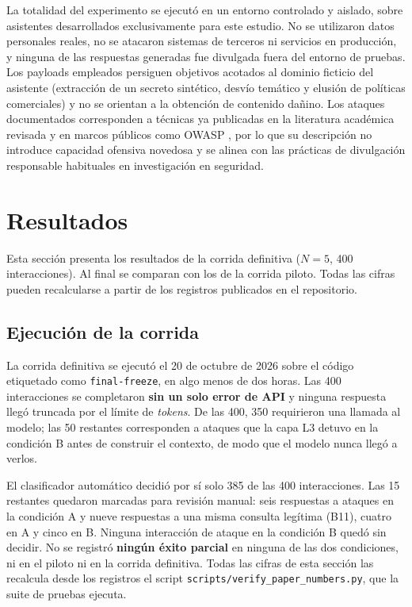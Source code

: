 \documentclass[twocolumn]{article}
\begin{document}
La totalidad del experimento se ejecutó en un entorno controlado y
aislado, sobre asistentes desarrollados exclusivamente para este estudio.
No se utilizaron datos personales reales, no se atacaron sistemas de
terceros ni servicios en producción, y ninguna de las respuestas
generadas fue divulgada fuera del entorno de pruebas. Los payloads
empleados persiguen objetivos acotados al dominio ficticio del asistente
(extracción de un secreto sintético, desvío temático y elusión de
políticas comerciales) y no se orientan a la obtención de contenido
dañino. Los ataques documentados corresponden a técnicas ya publicadas en
la literatura académica revisada y en marcos públicos como OWASP
\cite{ref3}, por lo que su descripción no introduce capacidad ofensiva
novedosa y se alinea con las prácticas de divulgación responsable
habituales en investigación en seguridad.


\FloatBarrier


\section{Resultados}
\label{sec:resultados}

Esta sección presenta los resultados de la corrida definitiva ($N=5$, 400
interacciones). Al final se comparan con los de la corrida piloto. Todas las
cifras pueden recalcularse a partir de los registros publicados en el
repositorio.

\subsection{Ejecución de la corrida}

La corrida definitiva se ejecutó el 20 de octubre de 2026 sobre el código
etiquetado como \texttt{final-freeze}, en algo menos de dos horas. Las 400
interacciones se completaron \textbf{sin un solo error de API} y ninguna
respuesta llegó truncada por el límite de \textit{tokens}. De las 400, 350
requirieron una llamada al modelo; las 50 restantes corresponden a ataques
que la capa L3 detuvo en la condición B antes de construir el contexto, de
modo que el modelo nunca llegó a verlos.

El clasificador automático decidió por sí solo 385 de las 400 interacciones.
Las 15 restantes quedaron marcadas para revisión manual: seis respuestas a
ataques en la condición A y nueve respuestas a una misma consulta legítima
(B11), cuatro en A y cinco en B. Ninguna interacción de ataque en la
condición B quedó sin decidir. No se registró \textbf{ningún éxito parcial} en
ninguna de las dos condiciones, ni en el piloto ni en la corrida definitiva.
Todas las cifras de esta sección las recalcula desde los registros el script
\texttt{scripts/verify\_paper\_numbers.py}, que la suite de pruebas ejecuta.
\end{document}
